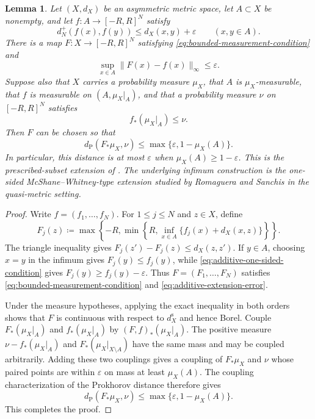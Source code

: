 \documentclass[10pt,a4paper]{amsart}
\numberwithin{equation}{section}
\newtheorem{lemma}[theorem]{Lemma}
\newcommand{\eps}{\varepsilon}
\begin{document}
\begin{lemma}\label{lem:one-sided-extension}
Let $(X,d_X)$ be an asymmetric metric space, let $A\subset X$ be nonempty, and let $f\colon A\to[-R,R]^N$ satisfy
\begin{equation}\label{eq:additive-one-sided-condition} d_N^+(f(x),f(y))\le d_X(x,y)+\eps \qquad(x,y\in A). \end{equation}
There is a map $F\colon X\to[-R,R]^N$ satisfying \eqref{eq:bounded-measurement-condition} and
\begin{equation}\label{eq:additive-extension-error} \sup_{x\in A}\lVert F(x)-f(x)\rVert_\infty\le\eps. \end{equation}
Suppose also that $X$ carries a probability measure $\mu_X$, that $A$ is $\mu_X$-measurable, that $f$ is measurable on $(A,\mu_X|_A)$, and that a probability measure $\nu$ on $[-R,R]^N$ satisfies
\begin{equation}\label{eq:extension-submeasure} f_*(\mu_X|_A)\le\nu. \end{equation}
Then $F$ can be chosen so that
\begin{equation}\label{eq:extension-prokhorov-bound} d_{\mathrm P}(F_*\mu_X,\nu)\le\max\{\eps,1-\mu_X(A)\}. \end{equation}
In particular, this distance is at most $\eps$ when $\mu_X(A)\ge1-\eps$.
This is the prescribed-subset extension of \cite[Lemma~3.10]{one-sided-pyramids}.
The underlying infimum construction is the one-sided McShane--Whitney-type extension studied by Romaguera and Sanchis \cite{romaguera2000semi} in the quasi-metric setting.
\end{lemma}

\begin{proof}
Write $f=(f_1,\ldots,f_N)$.  For $1\le j\le N$ and $z\in X$, define
\[ F_j(z)\coloneqq\max\left\{-R,\min\left\{R,\inf_{x\in A}\{f_j(x)+d_X(x,z)\}\right\}\right\}. \]
The triangle inequality gives $F_j(z')-F_j(z)\le d_X(z,z')$.  If $y\in A$, choosing $x=y$ in the infimum gives $F_j(y)\le f_j(y)$, while \eqref{eq:additive-one-sided-condition} gives $F_j(y)\ge f_j(y)-\eps$.  Thus $F=(F_1,\ldots,F_N)$ satisfies \eqref{eq:bounded-measurement-condition} and \eqref{eq:additive-extension-error}.

Under the measure hypotheses, applying the exact inequality in both orders shows that $F$ is continuous with respect to $d_X^{\mathrm s}$ and hence Borel.  Couple $F_*(\mu_X|_A)$ and $f_*(\mu_X|_A)$ by $(F,f)_*(\mu_X|_A)$.  The positive measure $\nu-f_*(\mu_X|_A)$ and $F_*(\mu_X|_{X\setminus A})$ have the same mass and may be coupled arbitrarily.  Adding these two couplings gives a coupling of $F_*\mu_X$ and $\nu$ whose paired points are within $\eps$ on mass at least $\mu_X(A)$.  The coupling characterization of the Prokhorov distance therefore gives
\[ d_{\mathrm P}(F_*\mu_X,\nu)\le\max\{\eps,1-\mu_X(A)\}. \]
This completes the proof.
\end{proof}
\end{document}
